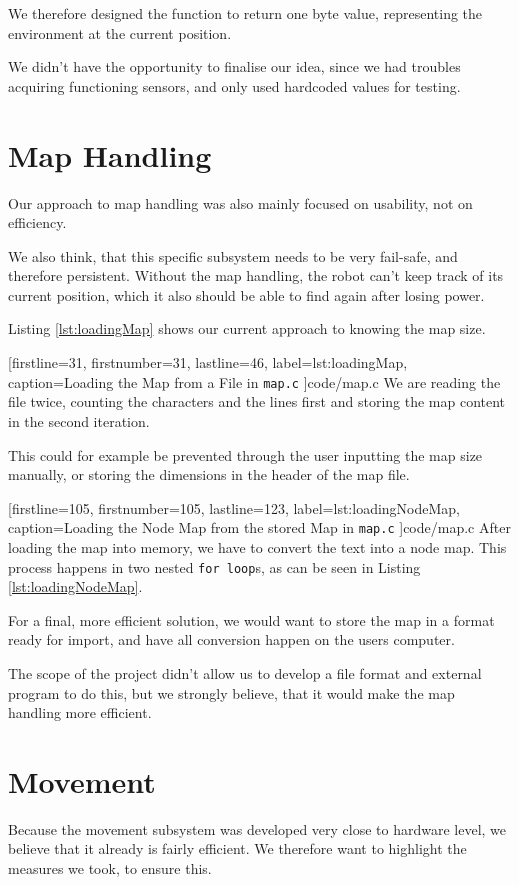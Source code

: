 We therefore designed the function to return one byte value,
representing the environment at the current position.

We didn't have the opportunity to finalise our idea,
since we had troubles acquiring functioning sensors,
and only used hardcoded values for testing.

\section{Map Handling}
Our approach to map handling was also mainly focused on usability,
not on efficiency.

We also think, that this specific subsystem needs to be very fail-safe,
and therefore persistent.
Without the map handling,
the robot can't keep track of its current position,
which it also should be able to find again after losing power.

Listing \ref{lst:loadingMap} shows our current approach to knowing the map size.


[firstline=31,				%
firstnumber=31,
lastline=46,
label=lst:loadingMap,	%
caption={Loading the Map from a File in {\tt map.c}}
]{code/map.c}
%
We are reading the file twice,
counting the characters and the lines first and storing the map content in the second iteration.

This could for example be prevented through the user inputting the map size manually,
or storing the dimensions in the header of the map file.


[firstline=105,				%
firstnumber=105,
lastline=123,
label=lst:loadingNodeMap,	%
caption={Loading the Node Map from the stored Map in {\tt map.c}}
]{code/map.c}
%
After loading the map into memory,
we have to convert the text into a node map.
This process happens in two nested {\tt for loop}s, as can be seen in Listing \ref{lst:loadingNodeMap}.

For a final, more efficient solution,
we would want to store the map in a format ready for import,
and have all conversion happen on the users computer.

The scope of the project didn't allow us to develop a file format and external program to do this,
but we strongly believe,
that it would make the map handling more efficient.

\section{Movement}
Because the movement subsystem was developed very close to hardware level,
we believe that it already is fairly efficient.
We therefore want to highlight the measures we took,
to ensure this.

